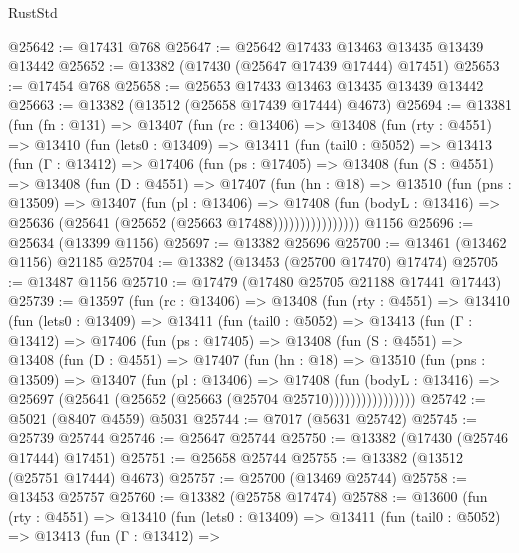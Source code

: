 \begin{lexlean}{RustStd}
\begin{coremodule}
@25642 := @17431 @768
@25647 := @25642 @17433 @13463 @13435 @13439 @13442
@25652 := @13382 (@17430 (@25647 @17439 @17444) @17451)
@25653 := @17454 @768
@25658 := @25653 @17433 @13463 @13435 @13439 @13442
@25663 := @13382 (@13512 (@25658 @17439 @17444) @4673)
@25694 := @13381
    (fun (fn : @131) =>
    @13407
      (fun (rc : @13406) =>
      @13408
        (fun (rty : @4551) =>
        @13410
          (fun (lets0 : @13409) =>
          @13411
            (fun (tail0 : @5052) =>
            @13413
              (fun (Γ : @13412) =>
              @17406
                (fun (ps : @17405) =>
                @13408
                  (fun (S : @4551) =>
                  @13408
                    (fun (D : @4551) =>
                    @17407
                      (fun (hn : @18) =>
                      @13510
                        (fun (pns : @13509) =>
                        @13407
                          (fun (pl : @13406) =>
                          @17408
                            (fun (bodyL : @13416) =>
                            @25636 (@25641 (@25652 (@25663 @17488))))))))))))))))
    @1156
@25696 := @25634 (@13399 @1156)
@25697 := @13382 @25696
@25700 := @13461 (@13462 @1156) @21185
@25704 := @13382 (@13453 (@25700 @17470) @17474)
@25705 := @13487 @1156
@25710 := @17479 (@17480 @25705 @21188 @17441 @17443)
@25739 := @13597
    (fun (rc : @13406) =>
    @13408
      (fun (rty : @4551) =>
      @13410
        (fun (lets0 : @13409) =>
        @13411
          (fun (tail0 : @5052) =>
          @13413
            (fun (Γ : @13412) =>
            @17406
              (fun (ps : @17405) =>
              @13408
                (fun (S : @4551) =>
                @13408
                  (fun (D : @4551) =>
                  @17407
                    (fun (hn : @18) =>
                    @13510
                      (fun (pns : @13509) =>
                      @13407
                        (fun (pl : @13406) =>
                        @17408
                          (fun (bodyL : @13416) =>
                          @25697 (@25641 (@25652 (@25663 (@25704 @25710))))))))))))))))
@25742 := @5021 (@8407 @4559) @5031
@25744 := @7017 (@5631 @25742)
@25745 := @25739 @25744
@25746 := @25647 @25744
@25750 := @13382 (@17430 (@25746 @17444) @17451)
@25751 := @25658 @25744
@25755 := @13382 (@13512 (@25751 @17444) @4673)
@25757 := @25700 (@13469 @25744)
@25758 := @13453 @25757
@25760 := @13382 (@25758 @17474)
@25788 := @13600
    (fun (rty : @4551) =>
    @13410
      (fun (lets0 : @13409) =>
      @13411
        (fun (tail0 : @5052) =>
        @13413
          (fun (Γ : @13412) =>

\end{coremodule}
\end{lexlean}
